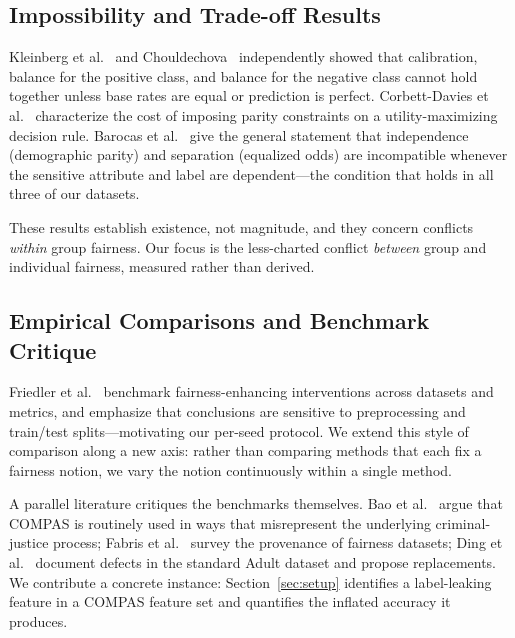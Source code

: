\subsection{Impossibility and Trade-off Results}

Kleinberg et al.~\cite{kleinberg2016inherent} and
Chouldechova~\cite{chouldechova2017fair} independently showed that
calibration, balance for the positive class, and balance for the negative
class cannot hold together unless base rates are equal or prediction is
perfect. Corbett-Davies et al.~\cite{corbett2017algorithmic} characterize the
cost of imposing parity constraints on a utility-maximizing decision rule.
Barocas et al.~\cite{barocas2019fairness} give the general statement that
independence (demographic parity) and separation (equalized odds) are
incompatible whenever the sensitive attribute and label are dependent---the
condition that holds in all three of our datasets.

These results establish existence, not magnitude, and they concern conflicts
\emph{within} group fairness. Our focus is the less-charted conflict
\emph{between} group and individual fairness, measured rather than derived.

\subsection{Empirical Comparisons and Benchmark Critique}

Friedler et al.~\cite{friedler2019comparative} benchmark fairness-enhancing
interventions across datasets and metrics, and emphasize that conclusions are
sensitive to preprocessing and train/test splits---motivating our per-seed
protocol. We extend this style of comparison along a new axis: rather than
comparing methods that each fix a fairness notion, we vary the notion
continuously within a single method.

A parallel literature critiques the benchmarks themselves. Bao et
al.~\cite{bao2021its} argue that COMPAS is routinely used in ways that
misrepresent the underlying criminal-justice process; Fabris et
al.~\cite{fabris2022algorithmic} survey the provenance of fairness datasets;
Ding et al.~\cite{ding2021retiring} document defects in the standard Adult
dataset and propose replacements. We contribute a concrete instance:
Section~\ref{sec:setup} identifies a label-leaking feature in a COMPAS feature
set and quantifies the inflated accuracy it produces.
